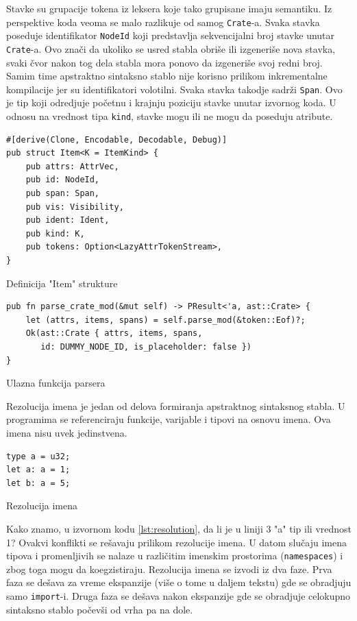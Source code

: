 \documentclass[11pt]{article}
\begin{document}
Stavke su grupacije tokena iz leksera koje tako grupisane imaju semantiku. Iz perspektive koda 
veoma se malo razlikuje od samog \verb|Crate|-a. Svaka stavka poseduje identifikator \verb|NodeId| 
koji predstavlja sekvencijalni broj stavke unutar \verb|Crate|-a. Ovo znači da ukoliko se usred stabla 
obriše ili izgeneriše nova stavka, svaki čvor nakon tog dela stabla mora ponovo da izgeneriše svoj redni broj.
Samim time apstraktno sintaksno stablo nije korisno prilikom inkrementalne kompilacije jer su identifikatori
volotilni. Svaka stavka takodje sadrži \verb|Span|. Ovo je tip koji odredjuje početnu i krajnju poziciju 
stavke unutar izvornog koda. U odnosu na vrednost tipa \verb|kind|, stavke mogu ili ne mogu da poseduju atribute. 

\begin{listing}[H]
\begin{verbatim}
#[derive(Clone, Encodable, Decodable, Debug)]
pub struct Item<K = ItemKind> {
    pub attrs: AttrVec,
    pub id: NodeId,
    pub span: Span,
    pub vis: Visibility,
    pub ident: Ident,
    pub kind: K,
    pub tokens: Option<LazyAttrTokenStream>,
}
\end{verbatim}
\caption{Definicija "Item" strukture}
\end{listing}

\begin{listing}[H]
\begin{verbatim}
pub fn parse_crate_mod(&mut self) -> PResult<'a, ast::Crate> {
    let (attrs, items, spans) = self.parse_mod(&token::Eof)?;
    Ok(ast::Crate { attrs, items, spans, 
       id: DUMMY_NODE_ID, is_placeholder: false })
}
\end{verbatim}
\caption{Ulazna funkcija parsera}
\end{listing}


Rezolucija imena je jedan od delova formiranja apstraktnog sintaksnog stabla.
U programima se referenciraju funkcije, varijable i tipovi na osnovu imena. Ova imena nisu uvek jedinstvena.

\begin{listing}[H]
\begin{verbatim}
type a = u32;
let a: a = 1;
let b: a = 5; 
\end{verbatim}
\caption{Rezolucija imena}
\label{lst:resolution}
\end{listing}

Kako znamo, u izvornom kodu \ref{lst:resolution}, da li je u liniji 3 "a" tip ili vrednost 1?
Ovakvi konflikti se rešavaju prilikom rezolucije imena. U datom slučaju imena tipova i promenljivih se nalaze 
u različitim imenskim prostorima (\verb|namespaces|) i zbog toga mogu da koegzistiraju.
Rezolucija imena se izvodi iz dva faze. Prva faza se dešava za vreme ekspanzije (više o tome u daljem tekstu) 
gde se obradjuju samo \verb|import|-i. Druga faza se dešava nakon ekspanzije gde se obradjuje celokupno 
sintaksno stablo počevši od vrha pa na dole. 
\end{document}
